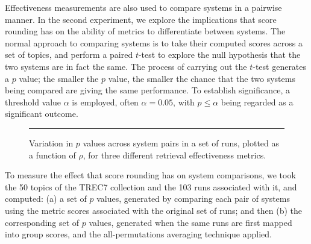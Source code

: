 
Effectiveness measurements are also used to compare systems in a
pairwise manner.
In the second experiment, we explore the implications that score
rounding has on the ability of metrics to differentiate between
systems.
The normal approach to comparing systems is to take their computed
scores across a set of topics, and perform a paired $t$-test to
explore the null hypothesis that the two systems are in fact the
same.
The process of carrying out the $t$-test generates a $p$ value; the
smaller the $p$ value, the smaller the chance that the two systems
being compared are giving the same performance.
To establish significance, a threshold value $\alpha$ is employed,
often $\alpha=0.05$, with $p\le\alpha$ being regarded as a
significant outcome.

\begin{figure}[t]
\centering
\rule{0.5mm}{45mm}
\caption{Variation in $p$ values across system pairs in a set
of runs, plotted as a function of $\rho$, for three different
retrieval effectiveness metrics.
{}
{}
{}
{}
\label{fig-pair-variation}}
\end{figure}

To measure the effect that score rounding has on system comparisons,
we took the 50 topics of the TREC7 {} collection
and the 103 runs associated with it, and computed: (a) a set
of $p$ values, generated by comparing each pair of systems using the
metric scores associated with the original set of runs; and then (b)
the corresponding set of $p$ values, generated when the same runs are
first mapped into group scores, and the all-permutations averaging
technique applied.

